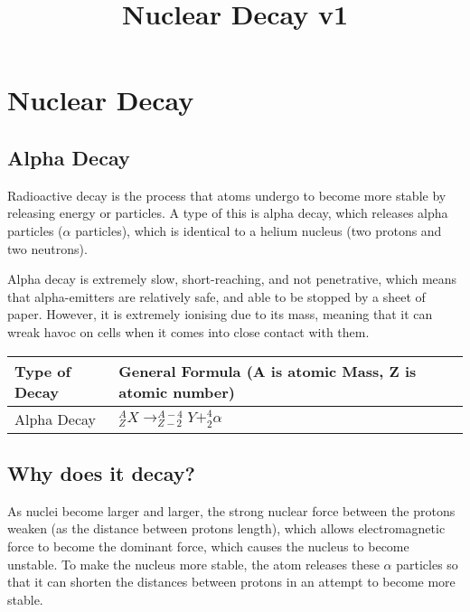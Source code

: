 \documentclass[
]{article}
\title{Nuclear Decay v1}
\author{}
\date{}
\begin{document}
\maketitle

\hypertarget{nuclear-decay}{%
\section{Nuclear Decay}\label{nuclear-decay}}

\hypertarget{alpha-decay}{%
\subsection{Alpha Decay}\label{alpha-decay}}

Radioactive decay is the process that atoms undergo to become more
stable by releasing energy or particles. A type of this is alpha decay,
which releases alpha particles ({\(\alpha\)} particles), which is
identical to a helium nucleus (two protons and two neutrons).

Alpha decay is extremely slow, short-reaching, and not penetrative,
which means that alpha-emitters are relatively safe, and able to be
stopped by a sheet of paper. However, it is extremely ionising due to
its mass, meaning that it can wreak havoc on cells when it comes into
close contact with them.

\begin{longtable}[]{@{}ll@{}}
\toprule()
Type of Decay & General Formula (A is atomic Mass, Z is atomic
number) \\
\midrule()
\endhead
Alpha Decay &
{\(_{Z}^{A}X \rightarrow_{Z - 2}^{A - 4}Y +_{2}^{4}\alpha\)} \\
\bottomrule()
\end{longtable}

\hypertarget{why-does-it-decay}{%
\subsection{Why does it decay?}\label{why-does-it-decay}}

As nuclei become larger and larger, the strong nuclear force between the
protons weaken (as the distance between protons length), which allows
electromagnetic force to become the dominant force, which causes the
nucleus to become unstable. To make the nucleus more stable, the atom
releases these {\(\alpha\)} particles so that it can shorten the
distances between protons in an attempt to become more stable.
\end{document}
